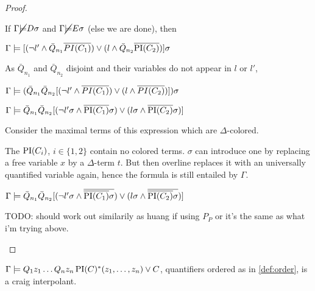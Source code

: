 \documentclass[,%
	paper=a4,%
	DIV14, 
	liststotoc,
	bibtotoc,
	draft=false,%
	numbers=noendperiod
]{scrartcl}
\begin{document}
\begin{proof}
\begin{enumerate}
			If $\Gamma \cancel {\models} D \sigma$ and 
			$\Gamma \cancel {\models} E \sigma$ (else we are done), then  

			$\Gamma \models [ (\lnot l' \land \bar Q_{n_1} \overline{PI(C_1)}) \lor (l \land \bar Q_{n_2} \overline{\operatorname{PI}(C_2)}) ] \sigma$

			As $\bar Q_{n_1}$ and $\bar Q_{n_2}$ disjoint and their variables do not appear in $l$ or $l'$,

			$\Gamma \models (\bar Q_{n_1} \bar Q_{n_2} [ (\lnot l' \land  \overline{PI(C_1)}) \lor (l \land \overline{PI(C_2)}) ] ) \sigma$

			$\Gamma \models \bar Q_{n_1} \bar Q_{n_2} [ (\lnot l'\sigma \land  \overline{\operatorname{PI}(C_1)}\sigma) \lor (l\sigma \land \overline{\operatorname{PI}(C_2)}\sigma) ] $

			Consider the maximal terms of this expression which are $\Delta$-colored.

			The $\operatorname{PI}(C_i)$, $i \in \{1,2\}$ contain no colored terms. $\sigma$ can introduce one by replacing a free variable $x$ by a $\Delta$-term $t$. But then overline replaces it with an universally quantified variable again, hence the formula is still entailed by $\Gamma$.

			$\Gamma \models \bar Q_{n_1} \bar Q_{n_2} [ (\lnot l'\sigma \land  \overline{\overline{\operatorname{PI}(C_1)}\sigma}) \lor (l\sigma \land \overline{\overline{\operatorname{PI}(C_2)}\sigma}) ] $



			TODO: should work out similarily as huang if using $P_P$ or it's the same as what i'm trying above.

	\end{enumerate}
\end{proof}



\begin{prop}
	$\Gamma \models Q_1 z_1 \ldots Q_n z_n \operatorname{PI}(C)^*(z_1, \ldots, z_n)  \lor C$, quantifiers ordered as in \ref{def:order}, is a craig interpolant.
\end{prop}
\end{document}
